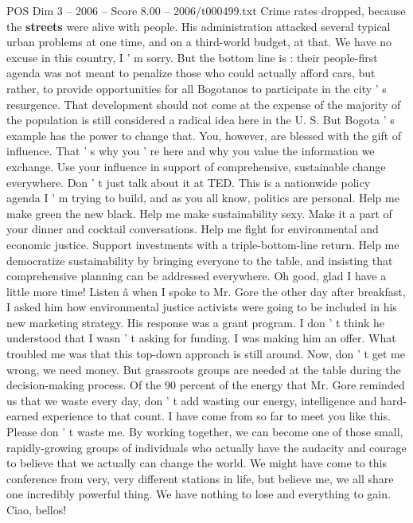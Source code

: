 \begin{textsample}{POS Dim 3 – 2006 – Score 8.00 – 2006/t000499.txt}
Crime rates dropped, because the \textbf{streets} were alive with people.
His administration attacked several typical urban problems at one time, and on a third-world budget, at that.
We have no excuse in this country, I ' m sorry.
But the bottom line is : their people-first agenda was not meant to penalize those who could actually afford cars, but rather, to provide opportunities for all Bogotanos to participate in the city ' s resurgence.
That development should not come at the expense of the majority of the population is still considered a radical idea here in the U.
S.
But Bogota ' s example has the power to change that.
You, however, are blessed with the gift of influence.
That ' s why you ' re here and why you value the information we exchange.
Use your influence in support of comprehensive, sustainable change everywhere.
Don ' t just talk about it at TED.
This is a nationwide policy agenda I ' m trying to build, and as you all know, politics are personal.
Help me make green the new black.
Help me make sustainability sexy.
Make it a part of your dinner and cocktail conversations.
Help me fight for environmental and economic justice.
Support investments with a triple-bottom-line return.
Help me democratize sustainability by bringing everyone to the table, and insisting that comprehensive planning can be addressed everywhere.
Oh good, glad I have a little more time!
Listen â when I spoke to Mr.
Gore the other day after breakfast, I asked him how environmental justice activists were going to be included in his new marketing strategy.
His response was a grant program.
I don ' t think he understood that I wasn ' t asking for funding.
I was making him an offer.
What troubled me was that this top-down approach is still around.
Now, don ' t get me wrong, we need money.
But grassroots groups are needed at the table during the decision-making process.
Of the 90 percent of the energy that Mr.
Gore reminded us that we waste every day, don ' t add wasting our energy, intelligence and hard-earned experience to that count.
I have come from so far to meet you like this.
Please don ' t waste me.
By working together, we can become one of those small, rapidly-growing groups of individuals who actually have the audacity and courage to believe that we actually can change the world.
We might have come to this conference from very, very different stations in life, but believe me, we all share one incredibly powerful thing.
We have nothing to lose and everything to gain.
Ciao, bellos!

\end{textsample}
